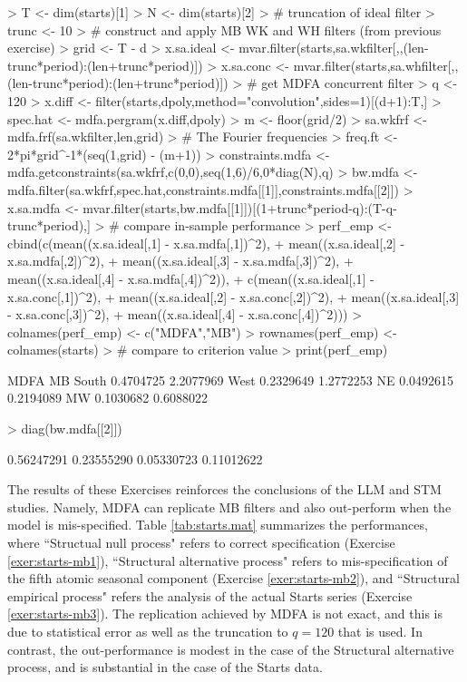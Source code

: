 \documentclass[a4paper]{book}
\begin{document}
\begin{Schunk}
\begin{Sinput}
> T <- dim(starts)[1]
> N <- dim(starts)[2]
> # truncation of ideal filter
> trunc <- 10
> # construct and apply MB WK and WH filters (from previous exercise)
> grid <- T - d
> x.sa.ideal <- mvar.filter(starts,sa.wkfilter[,,(len-trunc*period):(len+trunc*period)])
> x.sa.conc <- mvar.filter(starts,sa.whfilter[,,(len-trunc*period):(len+trunc*period)])
> # get MDFA concurrent filter
> q <- 120
> x.diff <- filter(starts,dpoly,method="convolution",sides=1)[(d+1):T,]
> spec.hat <- mdfa.pergram(x.diff,dpoly)
> m <- floor(grid/2)
> sa.wkfrf <- mdfa.frf(sa.wkfilter,len,grid)
> # The Fourier frequencies
> freq.ft <- 2*pi*grid^{-1}*(seq(1,grid) - (m+1))
> constraints.mdfa <- mdfa.getconstraints(sa.wkfrf,c(0,0),seq(1,6)/6,0*diag(N),q)
> bw.mdfa <- mdfa.filter(sa.wkfrf,spec.hat,constraints.mdfa[[1]],constraints.mdfa[[2]])
> x.sa.mdfa <- mvar.filter(starts,bw.mdfa[[1]])[(1+trunc*period-q):(T-q-trunc*period),]
> # compare in-sample performance
> perf_emp <- cbind(c(mean((x.sa.ideal[,1] - x.sa.mdfa[,1])^2),
+ 	mean((x.sa.ideal[,2] - x.sa.mdfa[,2])^2),
+ 	mean((x.sa.ideal[,3] - x.sa.mdfa[,3])^2),
+ 	mean((x.sa.ideal[,4] - x.sa.mdfa[,4])^2)),
+   c(mean((x.sa.ideal[,1] - x.sa.conc[,1])^2),
+ 	mean((x.sa.ideal[,2] - x.sa.conc[,2])^2),
+ 	mean((x.sa.ideal[,3] - x.sa.conc[,3])^2),
+ 	mean((x.sa.ideal[,4] - x.sa.conc[,4])^2)))
> colnames(perf_emp) <- c("MDFA","MB")
> rownames(perf_emp) <- colnames(starts)
> # compare to criterion value
> print(perf_emp)
\end{Sinput}
\begin{Soutput}
           MDFA        MB
South 0.4704725 2.2077969
West  0.2329649 1.2772253
NE    0.0492615 0.2194089
MW    0.1030682 0.6088022
\end{Soutput}
\begin{Sinput}
> diag(bw.mdfa[[2]])
\end{Sinput}
\begin{Soutput}
[1] 0.56247291 0.23555290 0.05330723 0.11012622
\end{Soutput}
\end{Schunk}
    
    
 The results of these Exercises   reinforces the conclusions of the LLM and STM studies.
 Namely, MDFA can replicate MB filters and also out-perform when the model is 
 mis-specified.  Table \ref{tab:starts.mat} summarizes the performances,
  where ``Structual null process" refers to correct
  specification (Exercise \ref{exer:starts-mb1}),
  ``Structural alternative process" refers to mis-specification of the fifth
   atomic seasonal component 
   (Exercise \ref{exer:starts-mb2}), and ``Structural empirical process" refers
   the analysis of the actual Starts series (Exercise \ref{exer:starts-mb3}).
   The replication achieved by MDFA is not exact, and this is due to statistical
    error as well as the truncation to $q = 120$ that is used.  In contrast,
   the out-performance is modest in the case of the Structural alternative process,
   and is substantial in the case of the Starts data.
  
\end{document}
